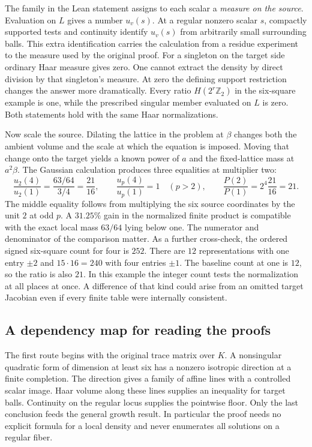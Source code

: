 \documentclass[12pt,letterpaper]{article}
\begin{document}
The family in the Lean statement assigns to each scalar a \emph{measure on the source}. Evaluation on $L$ gives a number $u_v(s)$. At a regular nonzero scalar $s$, compactly supported tests and continuity identify $u_v(s)$ from arbitrarily small surrounding balls. This extra identification carries the calculation from a residue experiment to the measure used by the original proof. For a singleton on the target side ordinary Haar measure gives zero. One cannot extract the density by direct division by that singleton's measure. At zero the defining support restriction changes the answer more dramatically. Every ratio $H(2^r\mathbb Z_2)$ in the six-square example is one, while the prescribed singular member evaluated on $L$ is zero. Both statements hold with the same Haar normalizations.

Now scale the source. Dilating the lattice in the problem at $\beta$ changes both the ambient volume and the scale at which the equation is imposed. Moving that change onto the target yields a known power of $a$ and the fixed-lattice mass at $a^2\beta$. The Gaussian calculation produces three equalities at multiplier two:
\[
 \frac{u_2(4)}{u_2(1)}=\frac{63/64}{3/4}=\frac{21}{16},\qquad
 \frac{u_p(4)}{u_p(1)}=1\quad(p>2),\qquad
 \frac{P(2)}{P(1)}=2^4\frac{21}{16}=21 .
\]
The middle equality follows from multiplying the six source coordinates by the unit $2$ at odd $p$. A $31.25\%$ gain in the normalized finite product is compatible with the exact local mass $63/64$ lying below one. The numerator and denominator of the comparison matter. As a further cross-check, the ordered signed six-square count for four is $252$. There are $12$ representations with one entry $\pm2$ and $15\cdot16=240$ with four entries $\pm1$. The baseline count at one is $12$, so the ratio is also $21$. In this example the integer count tests the normalization at all places at once. A difference of that kind could arise from an omitted target Jacobian even if every finite table were internally consistent.

\subsection{A dependency map for reading the proofs}
The first route begins with the original trace matrix over $K$. A nonsingular quadratic form of dimension at least six has a nonzero isotropic direction at a finite completion. The direction gives a family of affine lines with a controlled scalar image. Haar volume along these lines supplies an inequality for target balls. Continuity on the regular locus supplies the pointwise floor. Only the last conclusion feeds the general growth result. In particular the proof needs no explicit formula for a local density and never enumerates all solutions on a regular fiber.
\end{document}
